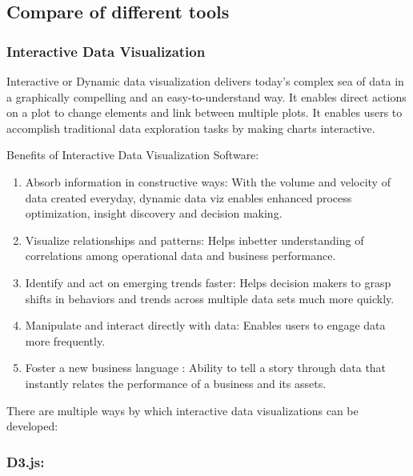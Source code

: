 \documentclass[]{book}
\providecommand{\tightlist}{%
  \setlength{\itemsep}{0pt}\setlength{\parskip}{0pt}}
\theoremstyle{definition}
\theoremstyle{definition}
\theoremstyle{definition}
\theoremstyle{remark}
\begin{document}
\subsection{Compare of different
tools}\label{compare-of-different-tools}

\subsubsection{Interactive Data
Visualization}\label{interactive-data-visualization}

Interactive or Dynamic data visualization delivers today's complex sea
of data in a graphically compelling and an easy-to-understand way. It
enables direct actions on a plot to change elements and link between
multiple plots. It enables users to accomplish traditional data
exploration tasks by making charts interactive.

Benefits of Interactive Data Visualization Software:

\begin{enumerate}
\def\labelenumi{\arabic{enumi}.}
\tightlist
\item
  Absorb information in constructive ways: With the volume and velocity
  of data created everyday, dynamic data viz enables enhanced process
  optimization, insight discovery and decision making.
\item
  Visualize relationships and patterns: Helps inbetter understanding of
  correlations among operational data and business performance.
\item
  Identify and act on emerging trends faster: Helps decision makers to
  grasp shifts in behaviors and trends across multiple data sets much
  more quickly.
\item
  Manipulate and interact directly with data: Enables users to engage
  data more frequently.
\item
  Foster a new business language : Ability to tell a story through data
  that instantly relates the performance of a business and its assets.
\end{enumerate}

\citep{benefits_interactive_viz}

There are multiple ways by which interactive data visualizations can be
developed:

\subsubsection{D3.js:}\label{d3.js}
\end{document}
